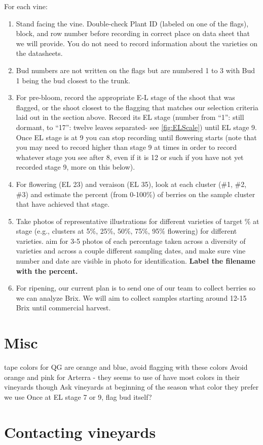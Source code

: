 \documentclass[11pt,letter]{article}
\begin{document}
For each vine:
\begin{enumerate}
	\item Stand facing the vine. Double-check Plant ID (labeled on one of the flags), block, and row number before recording in correct place on data sheet that we will provide. You do not need to record information about the varieties on the datasheets.
	\item Bud numbers are not written on the flags but are numbered 1 to 3 with Bud 1 being the bud closest to the trunk.
	\item For pre-bloom, record the appropriate E-L stage of the shoot that was flagged, or the shoot closest to the flagging that matches our selection criteria laid out in the section above. Record its EL stage (number from “1”: still dormant, to “17”: twelve leaves separated- see \ref{fig:ELScale}) until EL stage 9. Once EL stage is at 9 you can stop recording until flowering starts (note that you may need to record higher than stage 9 at times in order to record whatever stage you see after 8, even if it is 12 or such if you have not yet recorded stage 9, more on this below).
	\item  For flowering (EL 23) and veraison (EL 35), look at each cluster (\#1, \#2, \#3) and estimate the percent (from 0-100\%) of berries on the sample cluster that have achieved that stage. 
	\item Take photos of representative illustrations for different varieties of target \% at stage (e.g., clusters at 5\%, 25\%, 50\%, 75\%, 95\% flowering) for different varieties. aim for 3-5 photos of each percentage taken across a diversity of varieties and across a couple different sampling dates, and make sure vine number and date are visible in photo for identification. {\bf Label the filename with the percent.}
	\item For ripening, our current plan is to send one of our team to collect berries so we can analyze Brix. We will aim to collect samples starting around 12-15 Brix until commercial harvest. 
	
\end{enumerate}

\section{Misc}
tape colors for QG are orange and blue, avoid flagging with these colors
Avoid orange and pink for Arterra - they seems to use of have most colors in their vineyards though
Ask vineyards at beginning of the season what color they prefer we use
Once at EL stage 7 or 9, flag bud itself?

\section{Contacting vineyards}
\end{document}
